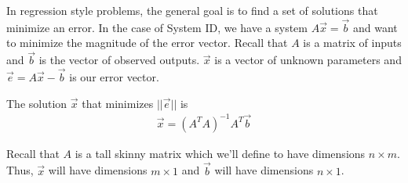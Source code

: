 

In regression style problems, the general goal is to find a set of solutions that minimize an error.
In the case of System ID, we have a system $A\vec{x} = \vec{b}$ and want to minimize the magnitude of the error vector.
Recall that $A$ is a matrix of inputs and $\vec{b}$ is the vector of observed outputs.
$\vec{x}$ is a vector of unknown parameters and $\vec{e} = A\vec{x} - \vec{b}$ is our error vector.

The solution $\vec{x}$ that minimizes $||\vec{e}||$ is
\begin{align*}
\vec{x} = (A^{T}A)^{-1}A^{T}\vec{b}
\end{align*}

Recall that $A$ is a tall skinny matrix which we'll define to have dimensions $n \times m$.
Thus, $\vec{x}$ will have dimensions $m \times 1$ and $\vec{b}$ will have dimensions $n \times 1$.


